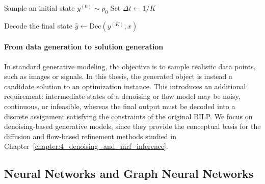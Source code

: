 \begin{algorithm}[t]
\caption{Conditional generation with a learned flow}
\label{alg:flow_sampling}
\DontPrintSemicolon


Sample an initial state $y^{(0)} \sim p_0$\;
Set $\Delta t \leftarrow 1/K$\;


Decode the final state $\hat{y} \leftarrow \mathrm{Dec}(y^{(K)}, x)$\;

\;

\end{algorithm}

\paragraph{From data generation to solution generation}
In standard generative modeling, the objective is to sample realistic data points, such as images or signals. In this thesis, the generated object is instead a candidate solution to an optimization instance. This introduces an additional requirement: intermediate states of a denoising or flow model may be noisy, continuous, or infeasible, whereas the final output must be decoded into a discrete assignment satisfying the constraints of the original BILP. We focus on denoising-based generative models, since they provide the conceptual basis for the diffusion and flow-based refinement methods studied in Chapter~\ref{chapter:4_denoising_and_mrf_inference}.


\subsection{Neural Networks and Graph Neural Networks}
\label{sec:neural_networks}

